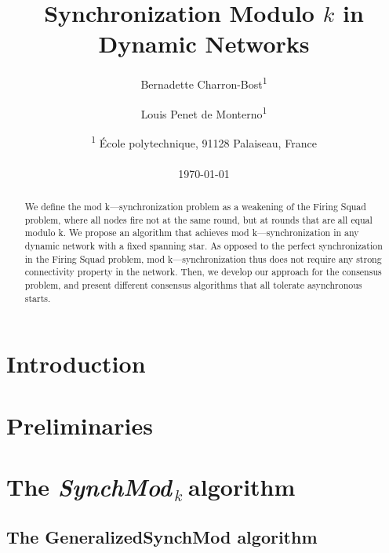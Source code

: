 \documentclass[11pt,letterpaper]{article}
\title{Synchronization Modulo $k$ in Dynamic Networks}
\author{Bernadette Charron-Bost\textsuperscript{1} \and Louis Penet de Monterno\textsuperscript{1}}
\date{\textsuperscript{1} \'Ecole polytechnique, 91128 Palaiseau, France\\~\\ \today}
\newcommand{\SM}{{\em SynchMod}$_{\,k}\ $}
\begin{document}
\maketitle
\tableofcontents

\begin{abstract}
	We define the mod k—synchronization problem as a weakening of the Firing Squad problem,
	where all nodes fire not at the same round, but at rounds that are all equal modulo k.
	We propose an algorithm that achieves mod k—synchronization  in any dynamic network
	with a fixed spanning star. As opposed to the perfect synchronization in
	the Firing Squad problem, mod k—synchronization thus does not require
	any strong connectivity property in the network. 
	Then, we develop our approach for the consensus problem,
	and present different consensus algorithms that all tolerate asynchronous starts.
\end{abstract}

\section{Introduction}

\section{Preliminaries}\label{sec:model}

\section{The \SM algorithm}

\subsection{The GeneralizedSynchMod algorithm}
\end{document}
